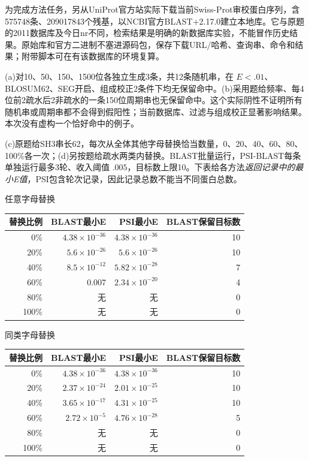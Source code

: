 为完成方法任务，另从UniProt官方站实际下载当前Swiss-Prot审校蛋白序列，含575748条、209017843个残基，以NCBI官方BLAST+2.17.0建立本地库。它与原题的2011数据库及今日nr不同，检索结果是明确的新数据库实验，不能冒作历史结果。原始库和官方二进制不塞进源码包，保存下载URL/哈希、查询串、命令和结果；附带脚本可在有该数据库的环境复算。

(a)对10、50、150、1500位各独立生成3条，共12条随机串，在 $E<.01$、BLOSUM62、SEG开启、组成校正2条件下均无保留命中。(b)采用题给频率、每4位前2疏水后2非疏水的一条150位周期串也无保留命中。这个实际阴性不证明所有随机串或周期串都不会得到假阳性；当前数据库、过滤与组成校正显著影响结果。本次没有虚构一个恰好命中的例子。

(c)原题给SH3串长62，每次从全体其他字母替换恰当数量，0、20、40、60、80、100\%各一次；(d)另按题给疏水两类内替换。BLAST批量运行，PSI-BLAST每条单独运行最多3轮、收入阈值 $.005$，目标数上限10。下表给各方法\emph{返回记录中的最小E值}，PSI包含轮次记录，因此记录总数不能当不同蛋白总数。

任意字母替换\par\begin{center}\begin{tabular}{rrrr}\toprule
替换比例 & BLAST最小E & PSI最小E & BLAST保留目标数\\\midrule
0\% & $4.38\times10^{-36}$ & $4.38\times10^{-36}$ & 10\\
20\% & $5.6\times10^{-26}$ & $5.6\times10^{-26}$ & 10\\
40\% & $8.5\times10^{-12}$ & $5.82\times10^{-28}$ & 7\\
60\% & 0.007 & $2.34\times10^{-20}$ & 4\\
80\% & 无 & 无 & 0\\
100\% & 无 & 无 & 0\\
\bottomrule\end{tabular}\end{center}

同类字母替换\par\begin{center}\begin{tabular}{rrrr}\toprule
替换比例 & BLAST最小E & PSI最小E & BLAST保留目标数\\\midrule
0\% & $4.38\times10^{-36}$ & $4.38\times10^{-36}$ & 10\\
20\% & $2.37\times10^{-24}$ & $2.01\times10^{-25}$ & 10\\
40\% & $3.65\times10^{-17}$ & $4.31\times10^{-25}$ & 10\\
60\% & $2.72\times10^{-5}$ & $4.76\times10^{-28}$ & 5\\
80\% & 无 & 无 & 0\\
100\% & 无 & 无 & 0\\
\bottomrule\end{tabular}\end{center}

